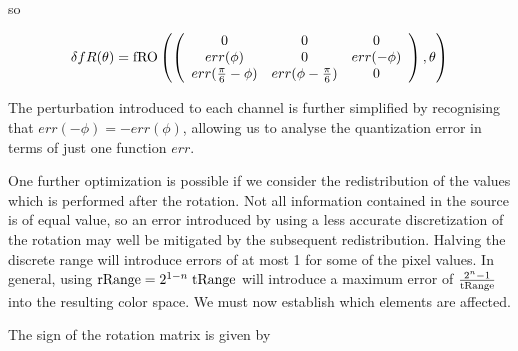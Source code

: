 so

\begin{equation}
\delta fR(\theta) = 
 \text{fRO}\left(  \left(
\begin{array}{ccc}
 0 & 0 & 0 \\
 err(\phi) & 0 & err(-\phi) \\
 err(\frac{\pi }{6}-\phi)    & err(\phi-\frac{\pi }{6}) & 0 \\
\end{array}
\right) ,\theta\right)
\end{equation}

The perturbation introduced to each channel is further simplified by recognising that $err(-\phi)=-err(\phi)$, allowing us to analyse the quantization error in terms of just one function $err$.


One further optimization is possible if we consider the redistribution of the values which is performed after the rotation. Not all information contained in the source is of equal value, so an error introduced by using a less accurate discretization of the rotation may well be mitigated by the subsequent redistribution. Halving the discrete range will introduce errors of at most 1 for some of the pixel values. In general, using $\text{rRange} = 2^{1-n} \; \text{tRange}$ will introduce a maximum error of $\frac{2^n -1}{\text{tRange}}$ into the resulting color space. We must now establish which elements are affected.

The sign of the rotation matrix is given by

